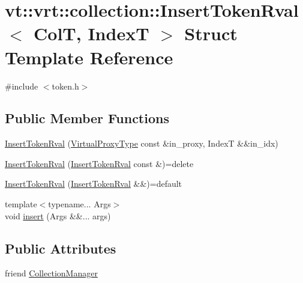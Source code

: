 \hypertarget{structvt_1_1vrt_1_1collection_1_1_insert_token_rval}{}\section{vt\+:\+:vrt\+:\+:collection\+:\+:Insert\+Token\+Rval$<$ ColT, IndexT $>$ Struct Template Reference}
\label{structvt_1_1vrt_1_1collection_1_1_insert_token_rval}


{\ttfamily \#include $<$token.\+h$>$}

\subsection*{Public Member Functions}
\begin{DoxyCompactItemize}
\item 
\hyperlink{structvt_1_1vrt_1_1collection_1_1_insert_token_rval_ae736f7ef7e7e6ed88a730c591642fe86}{Insert\+Token\+Rval} (\hyperlink{namespacevt_a1b417dd5d684f045bb58a0ede70045ac}{Virtual\+Proxy\+Type} const \&in\+\_\+proxy, IndexT \&\&in\+\_\+idx)
\item 
\hyperlink{structvt_1_1vrt_1_1collection_1_1_insert_token_rval_aea48b21e03ac5cab59b9e470af56f8c6}{Insert\+Token\+Rval} (\hyperlink{structvt_1_1vrt_1_1collection_1_1_insert_token_rval}{Insert\+Token\+Rval} const \&)=delete
\item 
\hyperlink{structvt_1_1vrt_1_1collection_1_1_insert_token_rval_ad7bd979f47256df2d3357e2232ca23c2}{Insert\+Token\+Rval} (\hyperlink{structvt_1_1vrt_1_1collection_1_1_insert_token_rval}{Insert\+Token\+Rval} \&\&)=default
\item 
{\footnotesize template$<$typename... Args$>$ }\\void \hyperlink{structvt_1_1vrt_1_1collection_1_1_insert_token_rval_a24233cafaa4d9a311c757573e3a61352}{insert} (Args \&\&... args)
\end{DoxyCompactItemize}
\subsection*{Public Attributes}
\begin{DoxyCompactItemize}
\item 
friend \hyperlink{structvt_1_1vrt_1_1collection_1_1_insert_token_rval_a10b822803e1ad9860efabbb9d979c842}{Collection\+Manager}
\end{DoxyCompactItemize}


